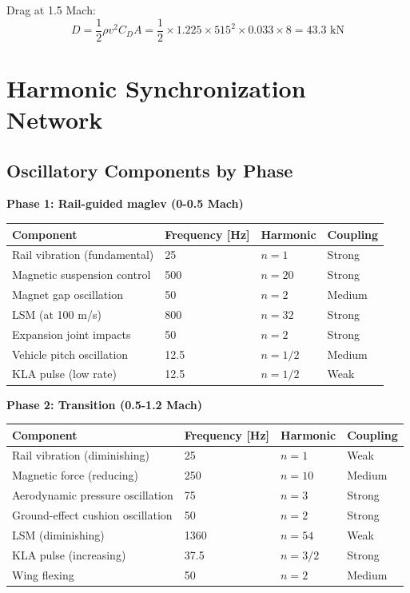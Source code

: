 \documentclass[12pt,a4paper]{article}
\begin{document}
Drag at 1.5 Mach:
\begin{equation}
D = \frac{1}{2} \rho v^2 C_D A = \frac{1}{2} \times 1.225 \times 515^2 \times 0.033 \times 8 = 43.3 \text{ kN}
\end{equation}

\section{Harmonic Synchronization Network}

\subsection{Oscillatory Components by Phase}

\textbf{Phase 1: Rail-guided maglev (0-0.5 Mach)}

\begin{center}
\begin{tabular}{|l|l|l|l|}
\hline
\textbf{Component} & \textbf{Frequency [Hz]} & \textbf{Harmonic} & \textbf{Coupling} \\
\hline
Rail vibration (fundamental) & 25 & $n=1$ & Strong \\
Magnetic suspension control & 500 & $n=20$ & Strong \\
Magnet gap oscillation & 50 & $n=2$ & Medium \\
LSM (at 100 m/s) & 800 & $n=32$ & Strong \\
Expansion joint impacts & 50 & $n=2$ & Strong \\
Vehicle pitch oscillation & 12.5 & $n=1/2$ & Medium \\
KLA pulse (low rate) & 12.5 & $n=1/2$ & Weak \\
\hline
\end{tabular}
\end{center}

\textbf{Phase 2: Transition (0.5-1.2 Mach)}

\begin{center}
\begin{tabular}{|l|l|l|l|}
\hline
\textbf{Component} & \textbf{Frequency [Hz]} & \textbf{Harmonic} & \textbf{Coupling} \\
\hline
Rail vibration (diminishing) & 25 & $n=1$ & Weak \\
Magnetic force (reducing) & 250 & $n=10$ & Medium \\
Aerodynamic pressure oscillation & 75 & $n=3$ & Strong \\
Ground-effect cushion oscillation & 50 & $n=2$ & Strong \\
LSM (diminishing) & 1360 & $n=54$ & Weak \\
KLA pulse (increasing) & 37.5 & $n=3/2$ & Strong \\
Wing flexing & 50 & $n=2$ & Medium \\
\hline
\end{tabular}
\end{center}
\end{document}
